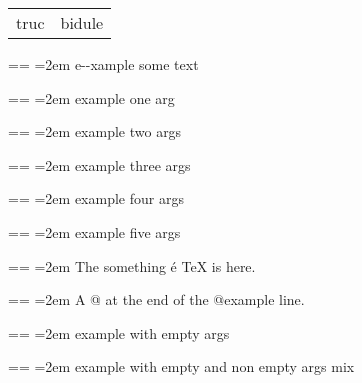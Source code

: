 \documentclass{book}
\makeatletter
\newenvironment{GNUTexinfopreformatted}{%
  \par\obeylines\obeyspaces\frenchspacing
  \parskip=\z@\parindent=\z@}{}
\makeatother
\begin{document}
\begin{tabular}{m{} m{}}%
truc &bidule\\
\end{tabular}%

\begin{GNUTexinfopreformatted}
\leftskip=2em\relax\ttfamily%
e{-}{-}xample  some
   text
\end{GNUTexinfopreformatted}

\begin{GNUTexinfopreformatted}
\leftskip=2em\relax\ttfamily%
example one arg
\end{GNUTexinfopreformatted}

\begin{GNUTexinfopreformatted}
\leftskip=2em\relax\ttfamily%
example two args
\end{GNUTexinfopreformatted}

\begin{GNUTexinfopreformatted}
\leftskip=2em\relax\ttfamily%
example three args
\end{GNUTexinfopreformatted}

\begin{GNUTexinfopreformatted}
\leftskip=2em\relax\ttfamily%
example four args
\end{GNUTexinfopreformatted}

\begin{GNUTexinfopreformatted}
\leftskip=2em\relax\ttfamily%
example five args
\end{GNUTexinfopreformatted}

\begin{GNUTexinfopreformatted}
\leftskip=2em\relax\ttfamily%
The something \'{e} \TeX{} is here.
\end{GNUTexinfopreformatted}

\begin{GNUTexinfopreformatted}
\leftskip=2em\relax\ttfamily%
A @ at the end of the @example line.
\end{GNUTexinfopreformatted}

\begin{GNUTexinfopreformatted}
\leftskip=2em\relax\ttfamily%
example with empty args
\end{GNUTexinfopreformatted}

\begin{GNUTexinfopreformatted}
\leftskip=2em\relax\ttfamily%
example with empty and non empty args mix
\end{GNUTexinfopreformatted}
\end{document}

